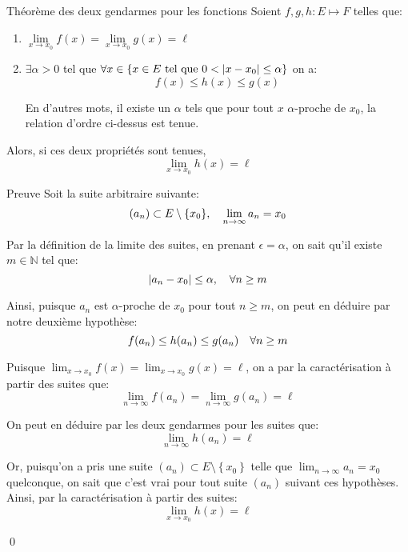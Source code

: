 \documentclass[a4paper]{article}
\begin{document}
\begin{parag}{Théorème des deux gendarmes pour les fonctions}
        Soient $f,g,h : E \mapsto F$ telles que:
        \begin{enumerate}
            \item $\lim\limits_{x \to x_0} f\left(x\right) = \lim\limits_{x \to x_0} g\left(x\right) = \ell$
            \item $\exists \alpha > 0$ tel que $\forall x \in \left\{x \in E \telque 0 < \left|x - x_0\right| \leq \alpha\right\}$ on a:
                \[f\left(x\right) \leq h\left(x\right) \leq g\left(x\right)\]

                En d'autres mots, il existe un $\alpha$ tels que pour tout $x$ $\alpha$-proche de $x_0$, la relation d'ordre ci-dessus est tenue.
        \end{enumerate}

        Alors, si ces deux propriétés sont tenues,
        \[\lim_{x \to x_0} h\left(x\right) = \ell\]


    \begin{subparag}{Preuve}
            Soit la suite arbitraire suivante:
            \[\left(a_n\right) \subset E \setminus \left\{x_0\right\}, \mathspace \lim_{n \to \infty} a_n = x_0\]

            Par la définition de la limite des suites, en prenant $\epsilon = \alpha$, on sait qu'il existe $m \in \mathbb{N}$ tel que:
            \[\left|a_n - x_0\right| \leq \alpha, \mathspace \forall n \geq m\]

            Ainsi, puisque $a_n$ est $\alpha$-proche de $x_0$ pour tout $n \geq m$, on peut en déduire par notre deuxième hypothèse:
            \[f\left(a_n\right) \leq h\left(a_n\right) \leq g\left(a_n\right) \mathspace \forall n \geq m\]

            Puisque $\lim_{x \to x_0} f\left(x\right) = \lim_{x \to x_0} g\left(x\right) = \ell$, on a par la caractérisation à partir des suites que:
            \[\lim_{n \to \infty} f\left(a_n\right) = \lim_{n \to \infty} g\left(a_n\right) = \ell\]

            On peut en déduire par les deux gendarmes pour les suites que:
            \[\lim_{n \to \infty} h\left(a_n\right) = \ell\]

            Or, puisqu'on a pris une suite $\left(a_n\right) \subset E \setminus \left\{x_0\right\}$ telle que $\lim_{n \to \infty} a_n = x_0$ quelconque, on sait que c'est vrai pour tout suite $\left(a_n\right)$ suivant ces hypothèses. Ainsi, par la caractérisation à partir des suites:
            \[\lim_{x \to x_0} h\left(x\right) = \ell\]

            \qed
    \end{subparag}

\end{parag}


    
\end{document}
